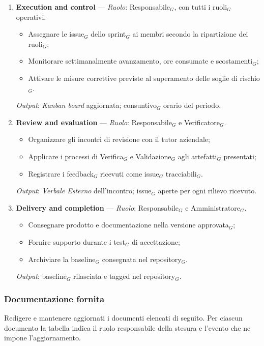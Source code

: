 \documentclass[a4paper, 10pt]{article}
\begin{document}
\begin{enumerate}
    \item \textbf{Execution and control} --- \textit{Ruolo}: Responsabile$_G$, con tutti i ruoli$_G$ operativi.
    \begin{itemize}
        \item Assegnare le issue$_G$ dello sprint$_G$ ai membri secondo la ripartizione dei ruoli$_G$;
        \item Monitorare settimanalmente avanzamento, ore consumate e scostamenti$_G$;
        \item Attivare le misure correttive previste al superamento delle soglie di rischio$_G$.
    \end{itemize}
    \textit{Output}: \textit{Kanban board} aggiornata; consuntivo$_G$ orario del periodo.

    \item \textbf{Review and evaluation} --- \textit{Ruolo}: Responsabile$_G$ e Verificatore$_G$.
    \begin{itemize}
        \item Organizzare gli incontri di revisione con il tutor aziendale;
        \item Applicare i processi di Verifica$_G$ e Validazione$_G$ agli artefatti$_G$ presentati;
        \item Registrare i feedback$_G$ ricevuti come issue$_G$ tracciabili$_G$.
    \end{itemize}
    \textit{Output}: \textit{Verbale Esterno} dell'incontro; issue$_G$ aperte per ogni rilievo ricevuto.

    \item \textbf{Delivery and completion} --- \textit{Ruolo}: Responsabile$_G$ e Amministratore$_G$.
    \begin{itemize}
        \item Consegnare prodotto e documentazione nella versione approvata$_G$;
        \item Fornire supporto durante i test$_G$ di accettazione;
        \item Archiviare la baseline$_G$ consegnata nel repository$_G$.
    \end{itemize}
    \textit{Output}: baseline$_G$ rilasciata e tagged nel repository$_G$.
\end{enumerate}

\label{subsubsec:doc-fornita}
\subsubsection{Documentazione fornita}
Redigere e mantenere aggiornati i documenti elencati di seguito. Per ciascun documento la tabella indica il ruolo responsabile della stesura e l'evento che ne impone l'aggiornamento.
\end{document}
